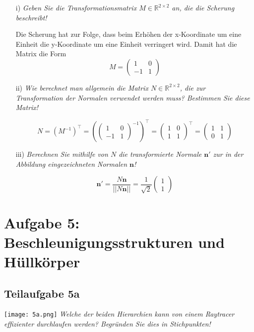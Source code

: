 \documentclass[a4paper]{scrartcl}
\begin{document}
\begin{itemize}
\item[i)] \textit{Geben Sie die Transformationsmatrix $M\in \mathbb{R}^{2\times 2}$ an, die die Scherung beschreibt!}

Die Scherung hat zur Folge, dass beim Erhöhen der x-Koordinate um eine Einheit die y-Koordinate um eine Einheit verringert wird. Damit hat die Matrix die Form
$$M=\begin{pmatrix}
1&0\\-1&1
\end{pmatrix}$$
\item[ii)] \textit{Wie berechnet man allgemein die Matrix $N \in
\mathbb{R}^{2\times 2}$, die zur Transformation der Normalen verwendet werden
muss? Bestimmen Sie diese Matrix!}

$$N = (M^{-1})^\top = \left(\begin{pmatrix}
1&0\\-1&1
\end{pmatrix}^{-1}\right)^{\top} = \begin{pmatrix}
1&0\\1&1
\end{pmatrix}^{\top} = \begin{pmatrix}
1&1\\0&1
\end{pmatrix}$$

\item[iii)] \textit{Berechnen Sie mithilfe von $N$ die transformierte Normale $\mathbf{n'}$ zur in der Abbildung
eingezeichneten Normalen $\mathbf{n}$!}

$$\mathbf{n'} = \frac{N\mathbf{n}}{||N\mathbf{n}||} = \frac{1}{\sqrt{2}}\begin{pmatrix}
1\\1
\end{pmatrix}$$
\end{itemize}

\section*{Aufgabe 5: Beschleunigungsstrukturen und Hüllkörper}
\subsection*{Teilaufgabe 5a}
\texttt{[image: 5a.png]}
\textit{Welche der beiden Hierarchien kann von einem Raytracer effizienter
durchlaufen werden? Begründen Sie dies in Stichpunkten!}
\end{document}
